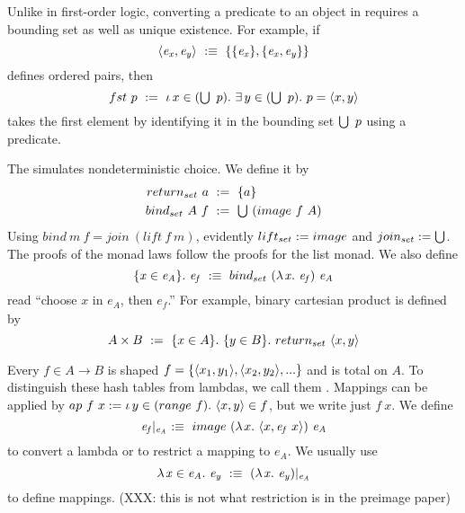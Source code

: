 Unlike in first-order logic, converting a predicate to an object in \targetlang requires a bounding set as well as unique existence. For example, if
\begin{equation}
	\pair{\mathit{e_x},\mathit{e_y}}\ \objstx\ \set{\set{\mathit{e_x}}, \set{\mathit{e_x},\mathit{e_y}}}
\end{equation}
defines ordered pairs, then
\begin{equation}
	fst~p\ \objdef\ \The{x \in (\U~p)} \Exists{y \in (\U~p)} p = \pair{x,y}
\end{equation}
takes the first element by identifying it in the bounding set $\textstyle\bigcup~p$ using a predicate.

The  simulates nondeterministic choice. We define it by
\begin{equation}
\begin{aligned}
	return_{set}~a &\ :=\ \{{a}\} \\
	bind_{set}~A~f &\ :=\ \textstyle\bigcup~(image~f~A)
\end{aligned}
\end{equation}
Using $bind~m~f = join~(lift~f~m)$, evidently $lift_{set} := image$ and $join_{set} := \textstyle\bigcup$.
The proofs of the monad laws follow the proofs for the list monad.
We also define
\begin{equation}
	\{{\mathit{x} \in \mathit{e_A}}\}\ldotp\, \mathit{e_f}\ :\equiv\ bind_{set}~(\lambda\mspace{2mu}{\mathit{x}}\ldotp\, \mathit{e_f})~\mathit{e_A}
\end{equation}
read ``choose $\mathit{x}$ in $\mathit{e_A}$, then $\mathit{e_f}$.''
For example, binary cartesian product is defined by
\begin{equation}
	A \times B\ :=\ \{{x \in A}\}\ldotp\, \{{y \in B}\}\ldotp\, return_{set}~\langle{x,y}\rangle
\end{equation}

Every $f \in A \to B$ is shaped $f = \{{\langle{x_1,y_1}\rangle,\langle{x_2,y_2}\rangle,...}\}$ and is total on $A$.
To distinguish these hash tables from lambdas, we call them .
Mappings can be applied by $ap~f~x := \iota\,{y \in (range~f)}\ldotp\, \langle{x,y}\rangle \in f$, but we write just $f~x$.
We define
\begin{equation}
	\mathit{e_f}\lvert_\mathit{e_A}\ \objstx\ image~(\fun{x} \pair{x,\mathit{e_f}~x})~\mathit{e_A}
\end{equation}
to convert a lambda or to restrict a mapping to $e_A$.
We usually use
\begin{equation}
	\lambda\mspace{2mu}{\mathit{x} \in \mathit{e_A}}\ldotp\, \mathit{e_y}\ :\equiv\ (\lambda\mspace{2mu}{\mathit{x}}\ldotp\, \mathit{e_y})\lvert_\mathit{e_A}
\end{equation}
to define mappings. (XXX: this is not what restriction is in the preimage paper)


